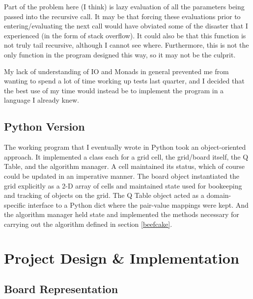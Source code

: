 \documentclass[12pt,a4paper]{article}
\begin{document}
		\par Part of the problem here (I think) is lazy evaluation of all the parameters being passed into the recursive call. It may be that forcing these evaluations prior to entering/evaluating the next call would have obviated some of the disaster that I experienced (in the form of stack overflow). It could also be that this function is not truly tail recursive, although I cannot see where. Furthermore, this is not the only function in the program designed this way, so it may not be the culprit. 
		\par My lack of understanding of IO and Monads in general prevented me from wanting to spend a lot of time working up tests last quarter, and I decided that the best use of my time would instead be to implement the program in a language I already knew.
		
		\subsection{Python Version}
		
		\par The working program that I eventually wrote in Python took an object-oriented approach. It implemented a class each for a grid cell, the grid/board itself, the Q Table, and the algorithm manager. A cell maintained its status, which of course could be updated in an imperative manner. The board object instantiated the grid explicitly as a 2-D array of cells and maintained state used for bookeeping and tracking of objects on the grid. The Q Table object acted as a domain-specific interface to a Python dict where the pair-value mappings were kept. And the algorithm manager held state and implemented the methods necessary for carrying out the algorithm defined in section \ref{beefcake}.
	
	\section{Project Design \& Implementation}
	
		\subsection{Board Representation}
		
\end{document}
